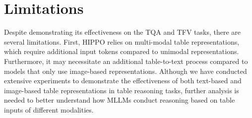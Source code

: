 \section*{Limitations}
Despite \method{} demonstrating its effectiveness on the TQA and TFV tasks, there are several limitations. First, HIPPO relies on multi-modal table representations, which require additional input tokens compared to unimodal representations. Furthermore, it may necessitate an additional table-to-text process compared to models that only use image-based representations. Although we have conducted extensive experiments to demonstrate the effectiveness of both text-based and image-based table representations in table reasoning tasks, further analysis is needed to better understand how MLLMs conduct reasoning based on table inputs of different modalities.